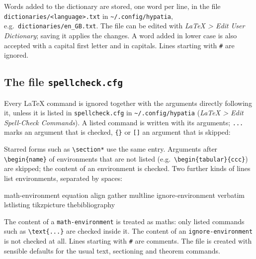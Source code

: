 \documentclass[11pt]{article}
\newcommand{\menu}[1]{\textsf{\textit{#1}}}
\newcommand{\file}[1]{\texttt{#1}}
\newcommand{\cfgdir}{\texttt{\textasciitilde/.config/hypatia}}
\begin{document}
    Words added to the dictionary are stored, one word per line, in the file \file{dictionaries/<language>.txt} in \cfgdir, e.g.\ \file{dictionaries/en\_GB.txt}. The file can be edited with \menu{LaTeX > Edit User Dictionary}; saving it applies the changes. A word added in lower case is also accepted with a capital first letter and in capitals. Lines starting with \verb+#+ are ignored.

    \subsection{The file \file{spellcheck.cfg}}

    Every LaTeX command is ignored together with the arguments directly following it, unless it is listed in \file{spellcheck.cfg} in \cfgdir{} (\menu{LaTeX > Edit Spell-Check Commands}). A listed command is written with its arguments; \verb+...+ marks an argument that is checked, \verb+{}+ or \verb+[]+ an argument that is skipped:
    Starred forms such as \verb+\section*+ use the same entry. Arguments after \verb+\begin{name}+ of environments that are not listed (e.g.\ \verb+\begin{tabular}{ccc}+) are skipped; the content of an environment is checked. Two further kinds of lines list environments, separated by spaces:
    \begin{Code}
math-environment equation align gather multline
ignore-environment verbatim lstlisting tikzpicture thebibliography
    \end{Code}
    The content of a \verb+math-environment+ is treated as maths: only listed commands such as \verb+\text{...}+ are checked inside it. The content of an \verb+ignore-environment+ is not checked at all. Lines starting with \verb+#+ are comments. The file is created with sensible defaults for the usual text, sectioning and theorem commands.
\end{document}
